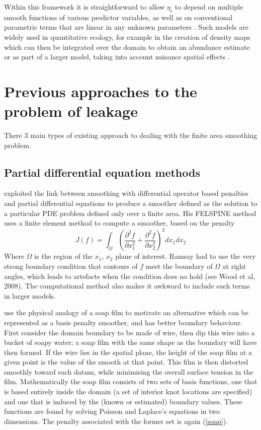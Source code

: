 \documentclass[smallextended]{svjour3}       %
\newcommand{\beq}{\begin{equation}}
\newcommand{\eeq}{\end{equation}}
\newcommand{\pdif}[2]{\frac{\partial #1}{\partial #2}}
\begin{document}
Within this framework it is straightforward to allow $\eta_i$ to depend on multiple smooth functions of various predictor variables, as well as on conventional parametric terms that are linear in any unknown parameters \citep{hastie1990generalized}. Such models are widely used in quantitative ecology, for example in the creation of density maps which can then be integrated over the domain to obtain an abundance estimate \citep[e.g.]{Hedley:2004et, WILLIAMS:2011in} or as part of a larger model, taking into account nuisance spatial effects \citep[e.g.]{Augustin:2009ui}.

\section{Previous approaches to the problem of leakage}
\label{previous-approaches}

There 3 main types of existing approach to dealing with the finite area smoothing problem.

\subsection{Partial differential equation methods}

\cite{Ramsay:2002uo} exploited the link between smoothing with differential operator based penalties and partial differential equations to produce a smoother defined as the solution to a particular PDE problem defined only over a finite area. His FELSPINE method uses a finite element method to compute a smoother, based on the penalty 
\beq
J(f) = \int_\Omega \left ( \pdif{^2 f}{x_1^2} + \pdif{^2 f}{x_2^2} \right )^2 dx_1 dx_2 
\label{soap}
\eeq 
Where $\Omega$ is the region of the $x_1$, $x_2$ plane of interest. Ramsay had to use the very strong boundary condition that contours of $f$ meet the boundary of $\Omega$ at right angles, which leads to artefacts when the condition does no hold (see Wood et al, 2008). The computational method also makes it awkward to include such terms in larger models.

\cite{Wood:2008vo} use the physical analogy of a soap film to motivate an alternative which can be represented as a basis penalty smoother, and has better boundary behaviour. First consider the domain boundary to be made of wire, then dip this wire into a bucket of soapy water; a soap film with the same shape as the boundary will have then formed. If the wire lies in the spatial plane, the height of the soap film at a given point is the value of the smooth at that point. This film is then distorted smoothly toward each datum, while minimising the overall surface tension in the film. Mathematically the soap film consists of two sets of basis functions, one that is based entirely inside the domain (a set of interior knot locations are specified) and one that is induced by the (known or estimated) boundary values. These functions are found by solving Poisson and Laplace's equations in two dimensions. The penalty associated with the former set is again (\ref{soap}). 
\end{document}
